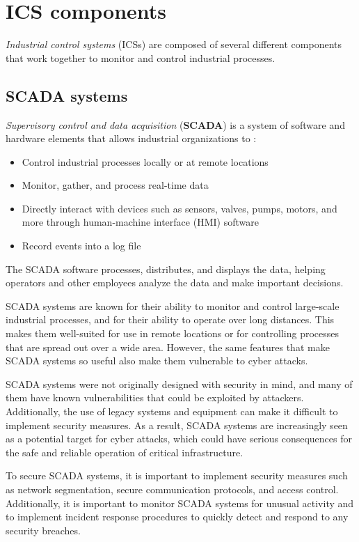 \section{ICS components}
\label{sec:ics_components}
\textit{Industrial control systems} (ICSs) are composed of several different components that work together to monitor and control industrial processes. 

\subsection{SCADA systems}
\textit{Supervisory control and data acquisition} (\textbf{SCADA}) is a system of software and hardware elements that allows industrial organizations to \cite{scada_definition}:
\begin{itemize}
	\item Control industrial processes locally or at remote locations
	\item Monitor, gather, and process real-time data
	\item Directly interact with devices such as sensors, valves, pumps, motors, and more through human-machine interface (HMI) software
	\item Record events into a log file
\end{itemize}

The SCADA software processes, distributes, and displays the data, helping operators and other employees analyze the data and make important decisions.

\bigskip
SCADA systems are known for their ability to monitor and control large-scale industrial processes, and for their ability to operate over long distances. This makes them well-suited for use in remote locations or for controlling processes that are spread out over a wide area. However, the same features that make SCADA systems so useful also make them vulnerable to cyber attacks.

SCADA systems were not originally designed with security in mind, and many of them have known vulnerabilities that could be exploited by attackers. Additionally, the use of legacy systems and equipment can make it difficult to implement security measures. As a result, SCADA systems are increasingly seen as a potential target for cyber attacks, which could have serious consequences for the safe and reliable operation of critical infrastructure.

To secure SCADA systems, it is important to implement security measures such as network segmentation, secure communication protocols, and access control. Additionally, it is important to monitor SCADA systems for unusual activity and to implement incident response procedures to quickly detect and respond to any security breaches.

